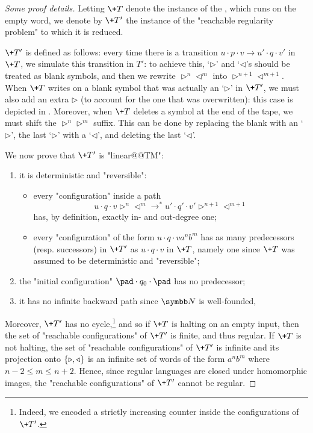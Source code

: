 \begin{proof}[Some proof details]
    Letting $\+T$ denote the instance of the , which runs on the empty word,
    we denote by $\+T'$ the instance of the "reachable regularity problem" to which it
    is reduced.

    $\+T'$ is defined as follows: every time there is a transition
    $u\cdot p \cdot v \to u' \cdot q \cdot v'$ in $\+T$,
	we simulate this transition in $T'$: to achieve this, `$\triangleright$' and `$\triangleleft$'s should be treated as blank symbols,
	and then we rewrite $\triangleright^n \triangleleft^m$ into $\triangleright^{n+1}\triangleleft^{m+1}$.
	When $\+T$ writes on a blank symbol that was actually an `$\triangleright$' in $\+T'$,
	we must also add an extra $\triangleright$ (to account for the one that was overwritten):
	this case is depicted in .
	Moreover, when $\+T$ deletes a symbol at the end of the tape,
	we must shift the $\triangleright^n \triangleright^m$ suffix. This can be done by replacing the blank
	with an `$\triangleright$', the last `$\triangleright$' with a `$\triangleleft$', and deleting the last `$\triangleleft$'.
	
    We now prove that $\+T'$ is "linear@@TM":
    \begin{enumerate}
        \item it is deterministic and "reversible":
        \begin{itemize}
            \item every "configuration" inside a path
            \[u \cdot q\cdot v \triangleright^{n} \triangleleft^{m} \to^* u' \cdot q' \cdot v' \triangleright^{n+1} \triangleleft^{m+1}\]
            has, by definition, exactly in- and out-degree one;
            \item every "configuration" of the form $u \cdot q \cdot v a^n b^m$ has as many 
            predecessors (resp. successors) in $\+T'$ as $u \cdot q \cdot v$ in $\+T$, namely one since $\+T$ was assumed to be deterministic and "reversible";
        \end{itemize}
        \item the "initial configuration" $\pad \cdot q_0 \cdot \pad$ has no predecessor;
        \item it has no infinite backward path since $\N$ is well-founded,
    \end{enumerate}
    Moreover, $\+T'$ has no cycle,\footnote{Indeed, we encoded a strictly increasing counter inside the configurations of $\+T'$.} and so if $\+T$ is halting on an empty input, then the set of "reachable configurations" of $\+T'$ is finite, and thus regular. If $\+T$ is not halting, the set of "reachable configurations" of $\+T'$ is infinite and its projection onto $\{\triangleright,\triangleleft\}$ is an infinite set of words of the form $a^{n} b^{m}$ where $n-2 \leq m \leq n+2$. Hence, since regular languages are closed under homomorphic images, the "reachable configurations" of $\+T'$ cannot be regular.
\end{proof}


